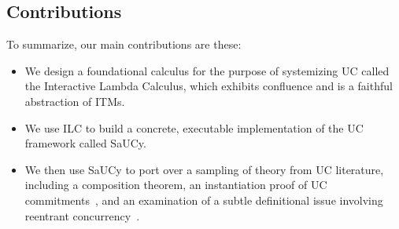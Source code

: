 \subsection{Contributions}
\label{subsec:contributions}

To summarize, our main contributions are these:

\begin{itemize}[leftmargin=*]
  \item We design a foundational calculus for the purpose of systemizing UC
    called the Interactive Lambda Calculus, which exhibits confluence and is a faithful abstraction of ITMs.
  \item We use ILC to build a concrete, executable implementation of the UC
    framework called SaUCy.
  \item We then use SaUCy to port over a sampling of theory from UC
literature, including a composition theorem,
an instantiation proof of UC commitments~\cite{canetti2001commitments},
and an examination of a subtle definitional issue involving reentrant concurrency~\cite{camenisch2016universal}.
\end{itemize}
